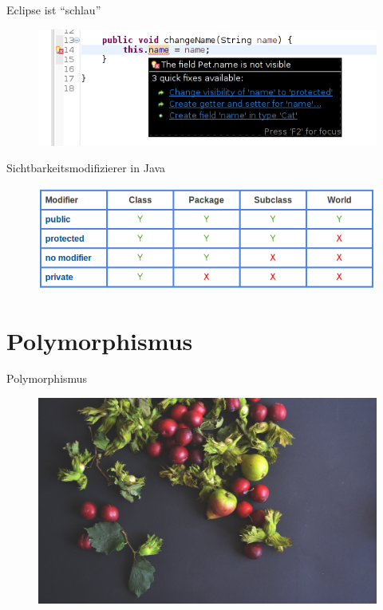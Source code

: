 \documentclass[18pt]{beamer}
\newcommand{\quotes}[1]{``#1''}
\begin{document}
\begin{frame}{Eclipse ist \quotes{schlau}}
    \begin{figure}
        \includegraphics[scale=.8]{img/privatefieldnotvisible.png}
    \end{figure}
\end{frame}

\begin{frame}{Sichtbarkeitsmodifizierer in Java}
    \begin{figure}
        \includegraphics[scale=.4]{img/pppp.png}
    \end{figure}
\end{frame}


\section{Polymorphismus}

\begin{frame}{Polymorphismus}
    \begin{figure}
        \includegraphics[scale=.075]{img/L18DEQZJQI.jpg}
    \end{figure}
\end{frame}
\end{document}
